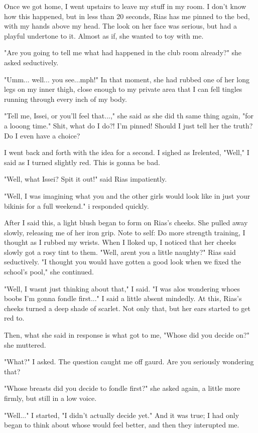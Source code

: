 \documentclass{article}
\begin{document}
Once we got home, I went upstairs to leave my stuff in my room. I don't know how this happened, but in less than 20 seconds, Rias has me pinned to the bed, with my hands above my head. The look on her face was serious, but had a playful undertone to it. Almost as if, she wanted to toy with me.

"Are you going to tell me what had happened in the club room already?" she asked seductively.

"Umm... well... you see...mph!" In that moment, she had rubbed one of her long legs on my inner thigh, close enough to my private area that I can fell tingles running through every inch of my body.

"Tell me, Issei, or you'll feel that...," she said as she did th same thing again, "for a looong time." Shit, what do I do?! I'm pinned! Should I just tell her the truth? Do I even have a choice?

I went back and forth with the idea for a second. I sighed as Irelented, "Well," I said as I turned slightly red. This is gonna be bad.

"Well, what Issei? Spit it out!" said Rias impatiently.

"Well, I was imagining what you and the other girls would look like in just your bikinis for a full weekend." i responded quickly.

After I said this, a light blush began to form on Rias's cheeks. She pulled away slowly, releasing me of her iron grip. Note to self: Do more strength training, I thought as I rubbed my wrists. When I lloked up, I noticed that her cheeks slowly got a rosy tint to them. "Well, arent you a little naughty?" Rias said seductively. "I thought you would have gotten a good look when we fixed the school's pool," she continued.

"Well, I wasnt just thinking about that," I said. "I was alos wondering whoes boobs I'm gonna fondle first..." I said a little absent mindedly. At this, Rias's cheeks turned a deep shade of scarlet. Not only that, but her ears started to get red to.

Then, what she said in response is what got to me, "Whose did you decide on?" she muttered.

"What?" I asked. The question caught me off gaurd. Are you seriously wondering that?

"Whose breasts did you decide to fondle first?" she asked again, a little more firmly, but still in a low voice.

"Well..." I started, "I didn't actually decide yet." And it was true; I had only began to think about whose would feel better, and then they interupted me.
\end{document}
